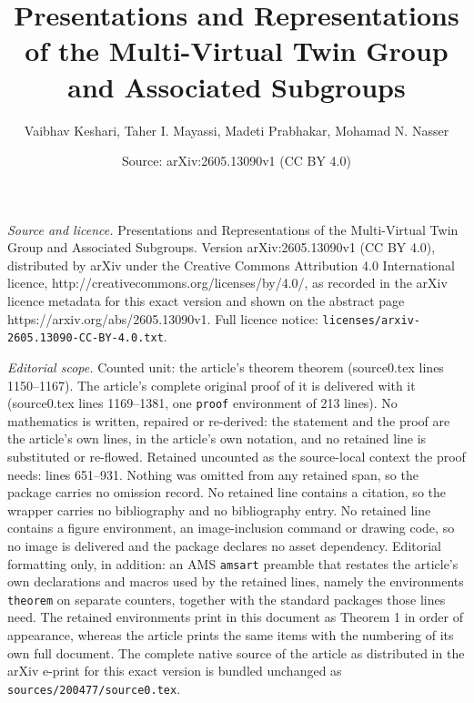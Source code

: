 \documentclass[10pt,a4paper]{amsart}
\title{Presentations and Representations of the Multi-Virtual Twin Group and Associated Subgroups}
\author{Vaibhav Keshari, Taher I. Mayassi, Madeti Prabhakar, Mohamad N. Nasser}
\date{Source: arXiv:2605.13090v1 (CC BY 4.0)}
\begin{document}
\maketitle

\noindent\emph{Source and licence.} Presentations and Representations of the Multi-Virtual Twin Group and Associated Subgroups. Version arXiv:2605.13090v1 (CC BY 4.0), distributed by arXiv under the Creative Commons Attribution 4.0 International licence, http://creativecommons.org/licenses/by/4.0/, as recorded in the arXiv licence metadata for this exact version and shown on the abstract page https://arxiv.org/abs/2605.13090v1. Full licence notice: \texttt{licenses/arxiv-2605.13090-CC-BY-4.0.txt}.\par\smallskip

\noindent\textit{Editorial scope.} Counted unit: the article's theorem theorem (source0.tex lines 1150--1167). The article's complete original proof of it is delivered with it (source0.tex lines 1169--1381, one \texttt{proof} environment of 213 lines). No mathematics is written, repaired or re-derived: the statement and the proof are the article's own lines, in the article's own notation, and no retained line is substituted or re-flowed.  Retained uncounted as the source-local context the proof needs: lines 651--931.  Nothing was omitted from any retained span, so the package carries no omission record.  No retained line contains a citation, so the wrapper carries no bibliography and no bibliography entry.  No retained line contains a figure environment, an image-inclusion command or drawing code, so no image is delivered and the package declares no asset dependency.  Editorial formatting only, in addition: an AMS \texttt{amsart} preamble that restates the article's own declarations and macros used by the retained lines, namely the environments \texttt{theorem} on separate counters, together with the standard packages those lines need.  The retained environments print in this document as Theorem 1 in order of appearance, whereas the article prints the same items with the numbering of its own full document.  The complete native source of the article as distributed in the arXiv e-print for this exact version is bundled unchanged as \texttt{sources/200477/source0.tex}.
\end{document}
